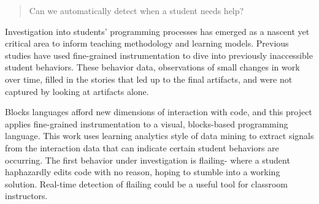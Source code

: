 % 
% 
%

\begin{quote}
Can we automatically detect when a student needs help?
\end{quote}
Investigation into students' programming processes has emerged as a nascent yet critical area to inform teaching methodology and learning models. Previous studies have used fine-grained instrumentation to dive into previously inaccessible student behaviors. These behavior data, observations of small changes in work over time, filled in the stories that led up to the final artifacts, and were not captured by looking at artifacts alone. 

Blocks languages afford new dimensions of interaction with code, and this project applies fine-grained instrumentation to a visual, blocks-based programming language. This work uses learning analytics style of data mining to extract signals from the interaction data that can indicate certain student behaviors are occurring. The first behavior under investigation is flailing- where a student haphazardly edits code with no reason, hoping to stumble into a working solution. Real-time detection of flailing could be a useful tool for classroom instructors.
